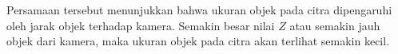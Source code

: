 

Persamaan tersebut menunjukkan bahwa ukuran objek pada citra dipengaruhi oleh jarak objek terhadap kamera. Semakin besar nilai \(Z\) atau semakin jauh objek dari kamera, maka ukuran objek pada citra akan terlihat semakin kecil.







